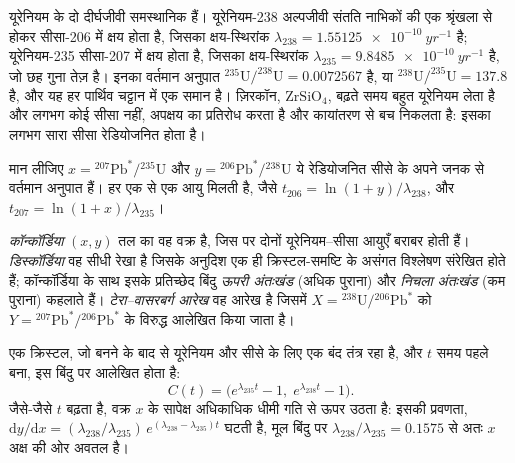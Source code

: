 यूरेनियम के दो दीर्घजीवी समस्थानिक हैं। यूरेनियम-238 अल्पजीवी संतति नाभिकों की एक श्रृंखला से होकर
सीसा-206 में क्षय होता है, जिसका क्षय-स्थिरांक $\lambda_{238} =
\qty{1.55125e-10}{yr^{-1}}$ है; यूरेनियम-235 सीसा-207 में क्षय होता है, जिसका क्षय-स्थिरांक $\lambda_{235}
= \qty{9.8485e-10}{yr^{-1}}$ है, जो छह गुना तेज़ है। इनका वर्तमान अनुपात
$^{235}\mathrm{U}/^{238}\mathrm{U} = 0.0072567$ है, या $^{238}\mathrm{U}/^{235}\mathrm{U}
= 137.8$ है, और यह हर पार्थिव चट्टान में एक समान है। ज़िरकॉन, $\mathrm{ZrSiO_4}$, बढ़ते समय
बहुत यूरेनियम लेता है और लगभग कोई सीसा नहीं, अपक्षय का प्रतिरोध करता है
और कायांतरण से बच निकलता है: इसका लगभग सारा सीसा रेडियोजनित होता है।

मान लीजिए $x = {}^{207}\mathrm{Pb}^*/{}^{235}\mathrm{U}$ और $y =
{}^{206}\mathrm{Pb}^*/{}^{238}\mathrm{U}$ ये रेडियोजनित सीसे के अपने जनक से वर्तमान अनुपात हैं। हर एक से एक आयु मिलती है, जैसे
$t_{206} = \ln(1 + y)/\lambda_{238}$,
और $t_{207} = \ln(1 + x)/\lambda_{235}$।

\begin{definition}[कॉन्कॉर्डिया, डिस्कॉर्डिया, अंतःखंड, टेरा--वासरबर्ग आरेख]
\label{def:b3:advanced-geochronology:concordia}
\emph{कॉन्कॉर्डिया} $(x, y)$ तल का वह वक्र है, जिस पर
दोनों यूरेनियम--सीसा आयुएँ बराबर होती हैं। \emph{डिस्कॉर्डिया} वह सीधी रेखा है
जिसके अनुदिश एक ही क्रिस्टल-समष्टि के असंगत विश्लेषण
संरेखित होते हैं; कॉन्कॉर्डिया के साथ इसके प्रतिच्छेद बिंदु
\emph{ऊपरी अंतःखंड} (अधिक पुराना) और
\emph{निचला अंतःखंड} (कम पुराना) कहलाते हैं।
\emph{टेरा--वासरबर्ग आरेख} वह आरेख है जिसमें
$X = {}^{238}\mathrm{U}/{}^{206}\mathrm{Pb}^*$ को $Y =
{}^{207}\mathrm{Pb}^*/{}^{206}\mathrm{Pb}^*$ के विरुद्ध आलेखित किया जाता है।
\end{definition}

\begin{theorem}[कॉन्कॉर्डिया]\label{thm:b3:advanced-geochronology:concordia}
एक क्रिस्टल, जो बनने के बाद से यूरेनियम और सीसे के लिए एक बंद तंत्र रहा है,
और $t$ समय पहले बना, इस बिंदु पर आलेखित होता है:
\[
C(t) = \bigl(e^{\lambda_{235}t} - 1,\; e^{\lambda_{238}t} - 1\bigr).
\]
जैसे-जैसे $t$ बढ़ता है, वक्र $x$ के सापेक्ष अधिकाधिक धीमी गति से ऊपर उठता है: इसकी प्रवणता,
$\mathrm dy/\mathrm dx = (\lambda_{238}/\lambda_{235})\,e^{(\lambda_{238} -
\lambda_{235})t}$ घटती है, मूल बिंदु पर $\lambda_{238}/\lambda_{235} = 0.1575$ से
अतः  $x$ अक्ष की ओर अवतल है।
\end{theorem}

